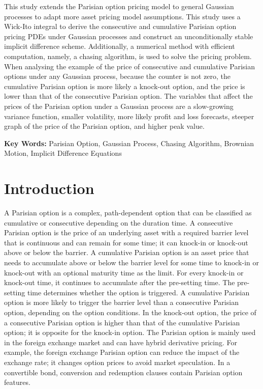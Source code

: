 \documentclass{ctexart} %
\begin{document}
This study extends the Parisian option pricing model to general Gaussian processes to adapt more asset pricing model assumptions. This study uses a Wick-Ito integral to derive the consecutive and cumulative Parisian option pricing PDEs under Gaussian processes and construct an unconditionally stable implicit difference scheme. Additionally, a numerical method with efficient computation, namely, a chasing algorithm, is used to solve the pricing problem. When analysing the example of the price of consecutive and cumulative Parisian options under any Gaussian process, because the counter is not zero, the cumulative Parisian option is more likely a knock-out option, and the price is lower than that of the consecutive Parisian option. The variables that affect the prices of the Parisian option under a Gaussian process are a slow-growing variance function, smaller volatility, more likely profit and loss forecasts, steeper graph of the price of the Parisian option, and higher peak value.

{\bf Key Words: }Parisian Option, Gaussian Process, Chasing Algorithm, Brownian Motion, Implicit Difference Equations

\section{Introduction}
A Parisian option is a complex, path-dependent option that can be classified as cumulative or consecutive depending on the duration time. A consecutive Parisian option is the price of an underlying asset with a required barrier level that is continuous and can remain for some time; it can knock-in or knock-out above or below the barrier. A cumulative Parisian option is an asset price that needs to accumulate above or below the barrier level for some time to knock-in or knock-out with an optional maturity time as the limit. For every knock-in or knock-out time, it continues to accumulate after the pre-setting time. The pre-setting time determines whether the option is triggered. A cumulative Parisian option is more likely to trigger the barrier level than a consecutive Parisian option, depending on the option conditions. In the knock-out option, the price of a consecutive Parisian option is higher than that of the cumulative Parisian option; it is opposite for the knock-in option. The Parisian option is mainly used in the foreign exchange market and can have hybrid derivative pricing. For example, the foreign exchange Parisian option can reduce the impact of the exchange rate; it changes option prices to avoid market speculation. In a convertible bond, conversion and redemption clauses contain Parisian option features.
\end{document}
